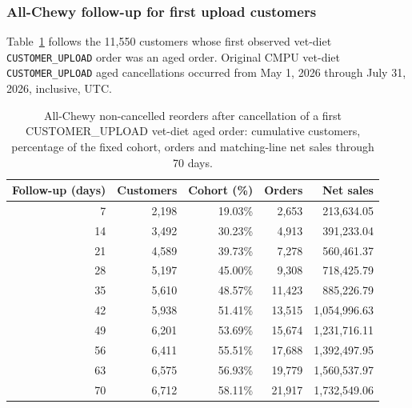 \clearpage
\subsubsection{All-Chewy follow-up for first upload customers}
Table~\ref{tab:financial-opportunity-new-upload-all-chewy} follows the
11,550 customers whose first observed vet-diet
\texttt{CUSTOMER\_UPLOAD} order was an aged order. Original CMPU vet-diet
\texttt{CUSTOMER\_UPLOAD} aged cancellations occurred from
May 1, 2026 through July 31, 2026, inclusive, UTC.

\begin{table}[!htbp]
\centering
\caption{All-Chewy non-cancelled reorders after cancellation of a first CUSTOMER\_UPLOAD vet-diet aged order: cumulative customers, percentage of the fixed cohort, orders and matching-line net sales through 70 days.}
\label{tab:financial-opportunity-new-upload-all-chewy}
\begin{tabular}{@{}rrrrr@{}}
\toprule
Follow-up (days) & Customers & Cohort (\%) & Orders & Net sales \\
\midrule
7 & 2,198 & 19.03\% & 2,653 & 213,634.05 \\
14 & 3,492 & 30.23\% & 4,913 & 391,233.04 \\
21 & 4,589 & 39.73\% & 7,278 & 560,461.37 \\
28 & 5,197 & 45.00\% & 9,308 & 718,425.79 \\
35 & 5,610 & 48.57\% & 11,423 & 885,226.79 \\
42 & 5,938 & 51.41\% & 13,515 & 1,054,996.63 \\
49 & 6,201 & 53.69\% & 15,674 & 1,231,716.11 \\
56 & 6,411 & 55.51\% & 17,688 & 1,392,497.95 \\
63 & 6,575 & 56.93\% & 19,779 & 1,560,537.97 \\
70 & 6,712 & 58.11\% & 21,917 & 1,732,549.06 \\
\bottomrule
\end{tabular}


\end{table}
